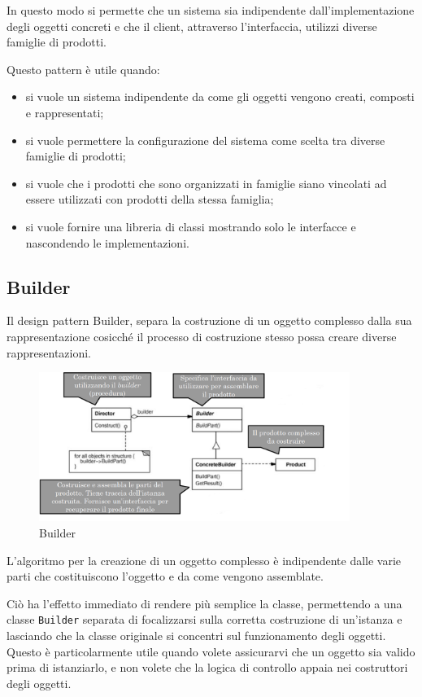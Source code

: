 In questo modo si permette che un sistema sia indipendente dall'implementazione degli oggetti concreti e che il client, attraverso l'interfaccia, utilizzi diverse famiglie di prodotti.

Questo pattern è utile quando:
\begin{itemize}
	\item si vuole un sistema indipendente da come gli oggetti vengono creati, composti e rappresentati;
	\item si vuole permettere la configurazione del sistema come scelta tra diverse famiglie di prodotti;
	\item si vuole che i prodotti che sono organizzati in famiglie siano vincolati ad essere utilizzati con prodotti della stessa famiglia;
	\item si vuole fornire una libreria di classi mostrando solo le interfacce e nascondendo le implementazioni.
\end{itemize}
\subsection{Builder}

Il design pattern Builder, separa la costruzione di un oggetto complesso dalla sua rappresentazione cosicché il processo di costruzione stesso possa creare diverse rappresentazioni.

\begin{figure}[H]
\includegraphics[width=0.9\textwidth]{res/img/DP/builder}
\caption{Builder}
\end{figure}

L'algoritmo per la creazione di un oggetto complesso è indipendente dalle varie parti che costituiscono l'oggetto e da come vengono assemblate.

Ciò ha l'effetto immediato di rendere più semplice la classe, permettendo a una classe \texttt{Builder} separata di focalizzarsi sulla corretta costruzione di un'istanza e lasciando che la classe originale si concentri sul funzionamento degli oggetti. 
Questo è particolarmente utile quando volete assicurarvi che un oggetto sia valido prima di istanziarlo, e non volete che la logica di controllo appaia nei costruttori degli oggetti. 

